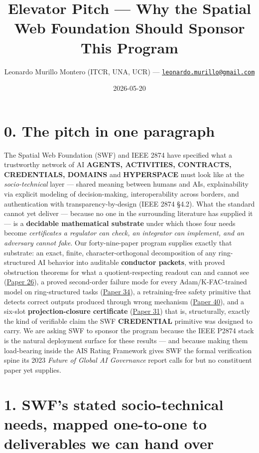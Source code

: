 \documentclass[
  letterpaper,
  11pt]{article}
\title{Elevator Pitch --- Why the Spatial Web Foundation Should Sponsor This Program}
\author{Leonardo Murillo Montero (ITCR, UNA, UCR) --- \href{mailto:leonardo.murillo@gmail.com}{\nolinkurl{leonardo.murillo@gmail.com}}}
\date{2026-05-20}
\theoremstyle{plain}
\theoremstyle{definition}
\theoremstyle{remark}
\begin{document}
\maketitle

\section{0. The pitch in one paragraph}\label{the-pitch-in-one-paragraph}

The Spatial Web Foundation (SWF) and IEEE 2874 have specified what a trustworthy network of AI \textbf{AGENTS, ACTIVITIES, CONTRACTS, CREDENTIALS, DOMAINS} and \textbf{HYPERSPACE} must look like at the \emph{socio-technical} layer --- shared meaning between humans and AIs, explainability via explicit modeling of decision-making, interoperability across borders, and authentication with transparency-by-design (IEEE 2874 §4.2). What the standard cannot yet deliver --- because no one in the surrounding literature has supplied it --- is a \textbf{decidable mathematical substrate} under which those four needs become \emph{certificates a regulator can check, an integrator can implement, and an adversary cannot fake}. Our forty-nine-paper program supplies exactly that substrate: an exact, finite, character-orthogonal decomposition of any ring-structured AI behavior into auditable \textbf{conductor packets}, with proved obstruction theorems for what a quotient-respecting readout can and cannot see (\href{C:/Projects/simplicial/26.conductor_probe_obstruction_theorem.md}{Paper 26}), a proved second-order failure mode for every Adam/K-FAC-trained model on ring-structured tasks (\href{C:/Projects/simplicial/34_the_conductor_blind_spot.md}{Paper 34}), a retraining-free safety primitive that detects correct outputs produced through wrong mechanism (\href{C:/Projects/simplicial/40_base_n_shortcut_audit_as_a_safety_primitive.md}{Paper 40}), and a six-slot \textbf{projection-closure certificate} (\href{C:/Projects/simplicial/31.projection_closure_theory.md}{Paper 31}) that is, structurally, exactly the kind of verifiable claim the SWF \textbf{CREDENTIAL} primitive was designed to carry. We are asking SWF to sponsor the program because the IEEE P2874 stack is the natural deployment surface for these results --- and because making them load-bearing inside the AIS Rating Framework gives SWF the formal verification spine its 2023 \emph{Future of Global AI Governance} report calls for but no constituent paper yet supplies.

\section{1. SWF's stated socio-technical needs, mapped one-to-one to deliverables we can hand over}\label{swfs-stated-socio-technical-needs-mapped-one-to-one-to-deliverables-we-can-hand-over}
\end{document}
